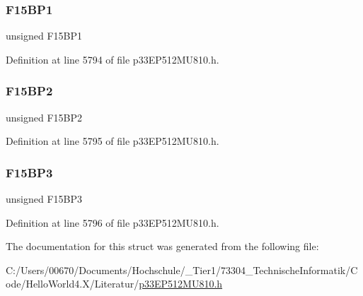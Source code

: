 \subsubsection{\texorpdfstring{F15\+B\+P1}{F15BP1}}
{\footnotesize\ttfamily unsigned F15\+B\+P1}



Definition at line 5794 of file p33\+E\+P512\+M\+U810.\+h.

\mbox{\label{structtag_c2_b_u_f_p_n_t4_b_i_t_s_ae990b3695ab0175cd7a80ffada713ec7}} 
\subsubsection{\texorpdfstring{F15\+B\+P2}{F15BP2}}
{\footnotesize\ttfamily unsigned F15\+B\+P2}



Definition at line 5795 of file p33\+E\+P512\+M\+U810.\+h.

\mbox{\label{structtag_c2_b_u_f_p_n_t4_b_i_t_s_a83963b21ba4820db13db6f7a67ed2398}} 
\subsubsection{\texorpdfstring{F15\+B\+P3}{F15BP3}}
{\footnotesize\ttfamily unsigned F15\+B\+P3}



Definition at line 5796 of file p33\+E\+P512\+M\+U810.\+h.



The documentation for this struct was generated from the following file\+:\begin{DoxyCompactItemize}
\item 
C\+:/\+Users/00670/\+Documents/\+Hochschule/\+\_\+\+Tier1/73304\+\_\+\+Technische\+Informatik/\+Code/\+Hello\+World4.\+X/\+Literatur/\hyperlink{p33_e_p512_m_u810_8h}{p33\+E\+P512\+M\+U810.\+h}\end{DoxyCompactItemize}
